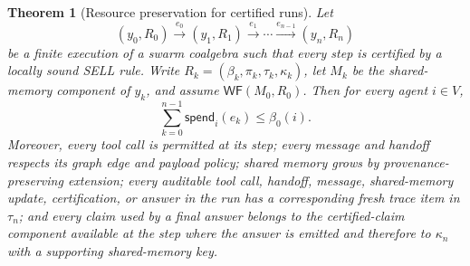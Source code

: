\documentclass[a4paper,fleqn]{cas-sc}
\newtheorem{theorem}{Theorem}
\begin{document}
\begin{theorem}[Resource preservation for certified runs]\label{thm:resource-preservation}
Let
\[
  (y_0,R_0) \xrightarrow{e_0} (y_1,R_1)
  \xrightarrow{e_1}\cdots
  \xrightarrow{e_{n-1}} (y_n,R_n)
\]
be a finite execution of a swarm coalgebra such that every step is certified by a locally sound SELL rule. Write \(R_k=(\beta_k,\pi_k,\tau_k,\kappa_k)\), let \(M_k\) be the shared-memory component of \(y_k\), and assume \(\mathsf{WF}(M_0,R_0)\). Then for every agent \(i\in V\),
\[
  \sum_{k=0}^{n-1} \mathsf{spend}_i(e_k)
  \le \beta_0(i).
\]
Moreover, every tool call is permitted at its step; every message and handoff
respects its graph edge and payload policy; shared memory grows by
provenance-preserving extension; every auditable tool call, handoff, message,
shared-memory update, certification, or answer in the run has a corresponding
fresh trace item in \(\tau_n\); and every claim used by a final answer belongs
to the certified-claim component available at the step where the answer is
emitted and therefore to \(\kappa_n\) with a supporting shared-memory key.
\end{theorem}
\end{document}
